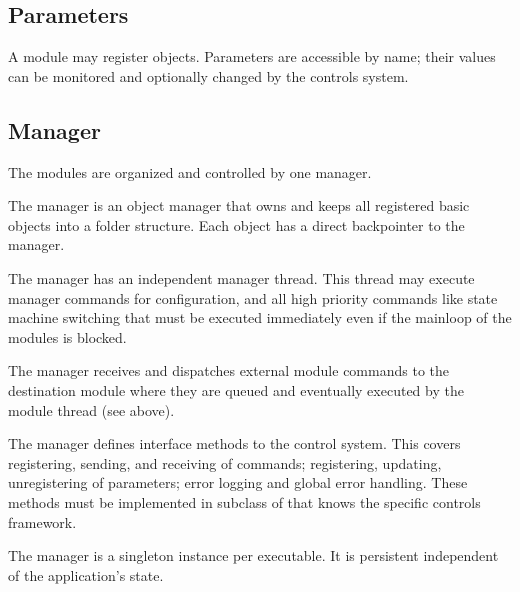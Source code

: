 \subsection{Parameters}
A module may register  objects. Parameters are 
   accessible by name; their values can be monitored and optionally changed by 
   the controls system. 
\subsection{Manager}
The modules are organized and controlled by one manager. 
\bcir
\item  The manager is an object manager that owns and keeps all 
      registered basic objects into a folder structure. Each object 
      has a direct backpointer to the manager. 
\item  The manager has an independent manager thread. 
      This thread may execute manager commands for configuration, 
      and all high priority commands like state machine switching 
      that must be executed immediately even if the mainloop of the modules is blocked.
\item  The manager receives and dispatches external module commands 
      to the destination module where they are queued and eventually executed 
      by the module thread (see above).
\item  The manager defines interface methods to the control system. 
      This covers registering, sending, and receiving of commands; registering, 
      updating, unregistering of parameters; error logging and global error handling. 
      These methods must be implemented in subclass of  that 
      knows the specific controls framework.
\item  The manager is a singleton instance per executable. 
      It is persistent independent of the application's state.
\ecir
